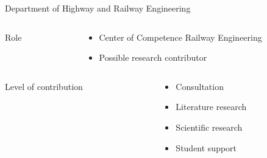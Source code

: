\documentclass[aspectratio=169]{beamer}
\begin{document}
\begin{frame}{Department of Highway and Railway Engineering}
    \pause
    \begin{columns}[T]
        \begin{column}{0.2\textwidth}
            Role
        \end{column}
        \begin{column}{0.7\textwidth}
            \begin{itemize}
                \item Center of Competence Railway Engineering
                \item Possible research contributor
            \end{itemize}
        \end{column}
    \end{columns}
    \vspace*{1cm}
    \pause

    \begin{columns}[T]
        \begin{column}{0.2\textwidth}
            Level of contribution
        \end{column}
        \begin{column}{0.7\textwidth}
            \begin{itemize}
                \item Consultation
                \item Literature research
                \item Scientific research
                \item Student support
            \end{itemize}
        \end{column}
    \end{columns}
\end{frame}
\end{document}
